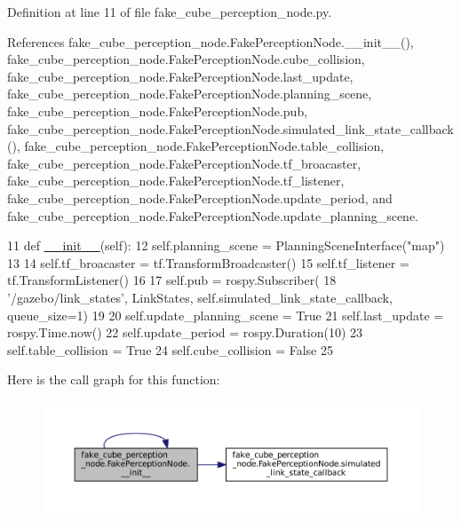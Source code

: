 Definition at line 11 of file fake\+\_\+cube\+\_\+perception\+\_\+node.\+py.



References fake\+\_\+cube\+\_\+perception\+\_\+node.\+Fake\+Perception\+Node.\+\_\+\+\_\+init\+\_\+\+\_\+(), fake\+\_\+cube\+\_\+perception\+\_\+node.\+Fake\+Perception\+Node.\+cube\+\_\+collision, fake\+\_\+cube\+\_\+perception\+\_\+node.\+Fake\+Perception\+Node.\+last\+\_\+update, fake\+\_\+cube\+\_\+perception\+\_\+node.\+Fake\+Perception\+Node.\+planning\+\_\+scene, fake\+\_\+cube\+\_\+perception\+\_\+node.\+Fake\+Perception\+Node.\+pub, fake\+\_\+cube\+\_\+perception\+\_\+node.\+Fake\+Perception\+Node.\+simulated\+\_\+link\+\_\+state\+\_\+callback(), fake\+\_\+cube\+\_\+perception\+\_\+node.\+Fake\+Perception\+Node.\+table\+\_\+collision, fake\+\_\+cube\+\_\+perception\+\_\+node.\+Fake\+Perception\+Node.\+tf\+\_\+broacaster, fake\+\_\+cube\+\_\+perception\+\_\+node.\+Fake\+Perception\+Node.\+tf\+\_\+listener, fake\+\_\+cube\+\_\+perception\+\_\+node.\+Fake\+Perception\+Node.\+update\+\_\+period, and fake\+\_\+cube\+\_\+perception\+\_\+node.\+Fake\+Perception\+Node.\+update\+\_\+planning\+\_\+scene.


\begin{DoxyCode}
11     \textcolor{keyword}{def }\hyperlink{classfake__cube__perception__node_1_1FakePerceptionNode_a6f5d90816c2222cf76bd632b5ad46457}{\_\_init\_\_}(self):
12         self.planning\_scene = PlanningSceneInterface(\textcolor{stringliteral}{"map"})
13 
14         self.tf\_broacaster = tf.TransformBroadcaster()
15         self.tf\_listener = tf.TransformListener()
16 
17         self.pub = rospy.Subscriber(
18             \textcolor{stringliteral}{'/gazebo/link\_states'}, LinkStates, self.simulated\_link\_state\_callback, queue\_size=1)
19 
20         self.update\_planning\_scene = \textcolor{keyword}{True}
21         self.last\_update = rospy.Time.now()
22         self.update\_period = rospy.Duration(10)
23         self.table\_collision = \textcolor{keyword}{True}
24         self.cube\_collision = \textcolor{keyword}{False}
25 
\end{DoxyCode}
Here is the call graph for this function\+:
\nopagebreak
\begin{figure}[H]
\begin{center}
\leavevmode
\includegraphics[width=350pt]{classfake__cube__perception__node_1_1FakePerceptionNode_a6f5d90816c2222cf76bd632b5ad46457_cgraph}
\end{center}
\end{figure}


